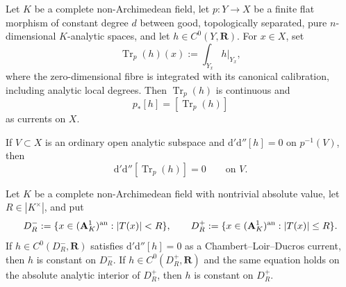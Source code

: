 
\begin{proposition}\label{prop:p062-finite-flat-continuous-trace}
Let \(K\) be a complete non-Archimedean field, let
\(p\colon Y\to X\) be a finite flat morphism of constant degree \(d\)
between good, topologically separated, pure \(n\)-dimensional
\(K\)-analytic spaces, and let \(h\in C^0(Y,\mathbf R)\).  For \(x\in X\),
set
\begin{equation}\label{eq:p062-finite-trace-definition}
 \operatorname{Tr}_p(h)(x)
   :=\int_{Y_x} h|_{Y_x},
\end{equation}
where the zero-dimensional fibre is integrated with its canonical
calibration, including analytic local degrees.  Then
\(\operatorname{Tr}_p(h)\) is continuous and
\begin{equation}\label{eq:p062-finite-trace-current}
                  p_*[h]=[\operatorname{Tr}_p(h)]
\end{equation}
as currents on \(X\).

If \(V\subset X\) is an ordinary open analytic subspace and
\(
 \mathrm d'\mathrm d''[h]=0
\)
on \(p^{-1}(V)\), then
\begin{equation}\label{eq:p062-finite-trace-hessian}
 \mathrm d'\mathrm d''[\operatorname{Tr}_p(h)]=0
 \qquad\text{on }V.
\end{equation}
\end{proposition}

\begin{proposition}\label{prop:p062-arbitrary-field-disc}
Let \(K\) be a complete non-Archimedean field with nontrivial absolute
value, let \(R\in |K^\times|\), and put
\[
 D_R^-:=\{x\in(\mathbf A_K^1)^{\mathrm{an}}:|T(x)|<R\},
 \qquad
 D_R^+:=\{x\in(\mathbf A_K^1)^{\mathrm{an}}:|T(x)|\leq R\}.
\]
If \(h\in C^0(D_R^-,\mathbf R)\) satisfies
\(
 \mathrm d'\mathrm d''[h]=0
\)
as a Chambert--Loir--Ducros current, then \(h\) is constant on \(D_R^-\).
If \(h\in C^0(D_R^+,\mathbf R)\) and the same equation holds on the
absolute analytic interior of \(D_R^+\), then \(h\) is constant on
\(D_R^+\).
\end{proposition}
